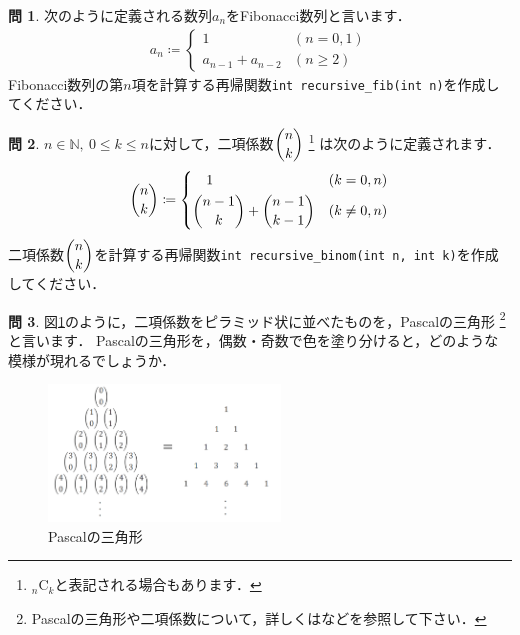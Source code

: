 \documentclass[dvipdfmx]{jsarticle}
\theoremstyle{definition}
\newtheorem{question}{問}[section]
\begin{document}
\begin{question}
    次のように定義される数列${a_n}$をFibonacci数列と言います．
    \begin{align*}
        a_n \coloneqq
            \begin{cases}
                1 & (n = 0, 1) \\
                a_{n-1} + a_{n-2} & (n \geq 2)
            \end{cases}
    \end{align*}
    Fibonacci数列の第$n$項を計算する再帰関数\verb|int recursive_fib(int n)|を作成してください．
\end{question}

\begin{question}
    $n \in \mathbb{N}, \ 0 \leq k \leq n$に対して，二項係数$\dbinom{n}{k}$
    \footnote{
        ${}_{n}\mathrm{C}_{k}$と表記される場合もあります．
    }
    は次のように定義されます．
    \begin{align*}
        \binom{n}{k} \coloneqq
            \begin{dcases}
                \quad 1 & (k=0, n) \\
                \binom{n-1}{k} + \binom{n-1}{k-1} & (k \neq 0, n)
            \end{dcases}
    \end{align*}
    二項係数$\dbinom{n}{k}$を計算する再帰関数\verb|int recursive_binom(int n, int k)|を作成してください．
\end{question}

\begin{question}
    図\ref{fig_pascal_tri}のように，二項係数をピラミッド状に並べたものを，Pascalの三角形
    \footnote{
        Pascalの三角形や二項係数について，詳しくは\cite{eular}などを参照して下さい．
    }
    と言います．
    Pascalの三角形を，偶数・奇数で色を塗り分けると，どのような模様が現れるでしょうか．
    \begin{figure}[H]
        \centering
        \includegraphics[width=0.55\textwidth]{figure/others/pascal_tri.png}
        \caption{Pascalの三角形}
        \label{fig_pascal_tri}
    \end{figure}
\end{question}
\end{document}
